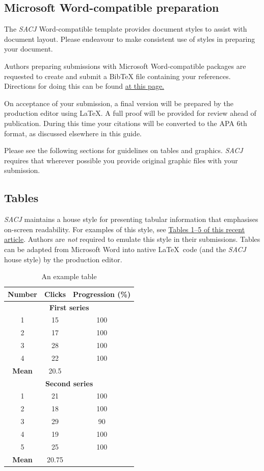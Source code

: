 \documentclass[submission]{sacjsub}
\begin{document}
\subsection{Microsoft Word-compatible preparation}
The {\em SACJ} Word-compatible template provides document styles to assist with document layout. Please endeavour to make consistent use of styles in preparing your document. 

Authors preparing submissions with Microsoft Word-compatible packages are requested to create and submit a BibTeX file containing your references. Directions for doing this can be found \href{http://sacj.cs.uct.ac.za/index.php/sacj/about/submissions#authorGuidelines}{at this page.}

On acceptance of your submission, a final version will be prepared by the production editor using \LaTeX. A full proof will be provided for review ahead of publication. During this time your citations will be converted to the APA 6th format, as discussed elsewhere in this guide. 

Please see the following sections for guidelines on tables and graphics. {\em SACJ} requires that wherever possible you provide original graphic files with your submission.  

\subsection{Tables}
{\em SACJ} maintains a house style for presenting tabular information that emphasises on-screen readability. For examples of this style, see \href{http://sacj.cs.uct.ac.za/index.php/sacj/article/view/367/180}{Tables 1--5 of this recent article}. Authors are {\em not} required to emulate this style in their submissions. Tables can be adapted from Microsoft Word into native \LaTeX~code (and the {\em SACJ} house style) by the production editor. 

\begin{table}[ht]
\centering 
\caption{An example table}
\label{table1}
\begin{tabular} {| c | c | c |} \hline
{\bfseries Number} & {\bfseries Clicks} & {\bfseries Progression (\%) }\\ \hline
\multicolumn{3}{|c|}{{\bfseries First series}} \\ \hline
1 & 15 & 100 \\
2 & 17 & 100 \\
3 & 28 & 100 \\
4 & 22 & 100 \\ \hline
{\bfseries Mean } & { 20.5} & \\ \hline
\multicolumn{3}{|c|}{{\bfseries Second series}} \\ \hline
1 & 21 & 100 \\
2 & 18 & 100 \\
3 & 29 & 90 \\
4 & 19 & 100 \\
5 & 25 & 100 \\ \hline
{\bfseries Mean} & { 20.75} & \\ \hline
\end{tabular}
\end{table}
\end{document}
